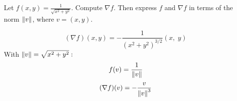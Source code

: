 \begin{exercise}
	Let $ f(x,y) = \frac{1}{\sqrt{x^2 + y^2}} $. Compute $\nabla f$. Then express $f$ and $\nabla f$ in terms of the norm $\left\lVert v \right\rVert$, where $ v = (x,y) $.
\end{exercise}

\begin{solution}
	$$
		(\nabla f)(x,y) = -\frac{1}{(x^2 + y^2)^{3/2}} \left( x, \; y \right)
	$$
	With $ \left\lVert v \right\rVert = \sqrt{x^2 + y^2}:$
	$$
		f(v) = \frac{1}{\left\lVert v \right\rVert}
	$$
	$$
		(\nabla f)(v) = -\frac{v}{\left\lVert v \right\rVert^3}
	$$
\end{solution}
